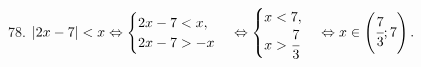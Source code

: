 78. $|2x-7|<x \Leftrightarrow \begin{cases} 2x-7<x,\\ 2x-7> -x\end{cases} \Leftrightarrow \begin{cases} x<7,\\ x>\cfrac{7}{3}\end{cases}
\Leftrightarrow x\in\left(\cfrac{7}{3};7\right).$\\

